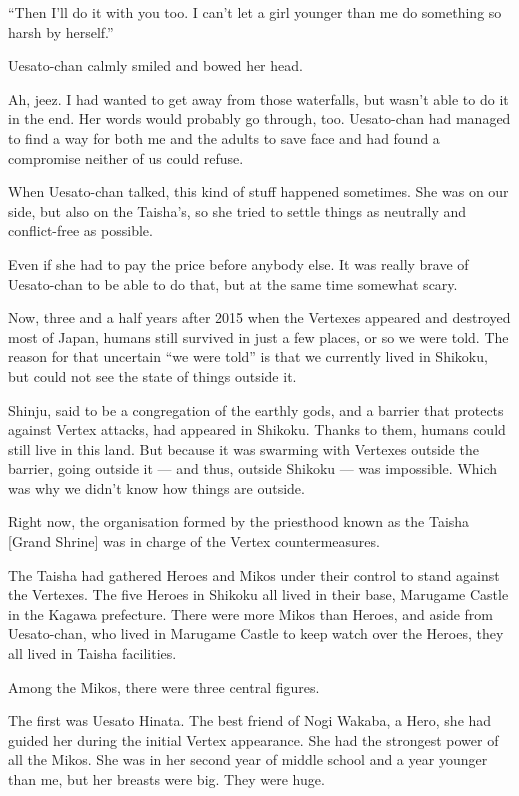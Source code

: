 ``Then I'll do it with you too. I can't let a girl younger than me do something so harsh by herself.''

Uesato-chan calmly smiled and bowed her head.

Ah, jeez. I had wanted to get away from those waterfalls, but wasn't able to do it in the end. Her words would probably go through, too. Uesato-chan had managed to find a way for both me and the adults to save face and had found a compromise neither of us could refuse.

When Uesato-chan talked, this kind of stuff happened sometimes. She was on our side, but also on the Taisha's, so she tried to settle things as neutrally and conflict-free as possible.

Even if she had to pay the price before anybody else. It was really brave of Uesato-chan to be able to do that, but at the same time somewhat scary.

Now, three and a half years after 2015 when the Vertexes appeared and destroyed most of Japan, humans still survived in just a few places, or so we were told. The reason for that uncertain ``we were told'' is that we currently lived in Shikoku, but could not see the state of things outside it.

Shinju, said to be a congregation of the earthly gods, and a barrier that protects against Vertex attacks, had appeared in Shikoku. Thanks to them, humans could still live in this land. But because it was swarming with Vertexes outside the barrier, going outside it --- and thus, outside Shikoku --- was impossible. Which was why we didn't know how things are outside.

Right now, the organisation formed by the priesthood known as the Taisha [Grand Shrine] was in charge of the Vertex countermeasures.

The Taisha had gathered Heroes and Mikos under their control to stand against the Vertexes. The five Heroes in Shikoku all lived in their base, Marugame Castle in the Kagawa prefecture. There were more Mikos than Heroes, and aside from Uesato-chan, who lived in Marugame Castle to keep watch over the Heroes, they all lived in Taisha facilities.

Among the Mikos, there were three central figures.

The first was Uesato Hinata. The best friend of Nogi Wakaba, a Hero, she had guided her during the initial Vertex appearance. She had the strongest power of all the Mikos. She was in her second year of middle school and a year younger than me, but her breasts were big. They were huge.

